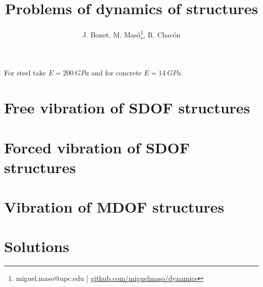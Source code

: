 \documentclass{problems}
\title[Dynamics of structures]{Problems of dynamics of structures}
\author{J. Bonet, M. Masó\footnote{miguel.maso@upc.edu | \href{https://github.com/miguelmaso/dynamics}{github.com/miguelmaso/dynamics}}, R. Chacón}
\begin{document}
\maketitle

For steel take $E=\SI{200}{GPa}$ and for concrete $E=\SI{14}{GPa}$.

\section{Free vibration of SDOF structures}





\section{Forced vibration of SDOF structures}






% 
% 
% 
% 

\section{Vibration of MDOF structures}



% 
% 

\newpage
\section{Solutions}
\shipoutAnswer

{}
\printbibliography
\end{document}
